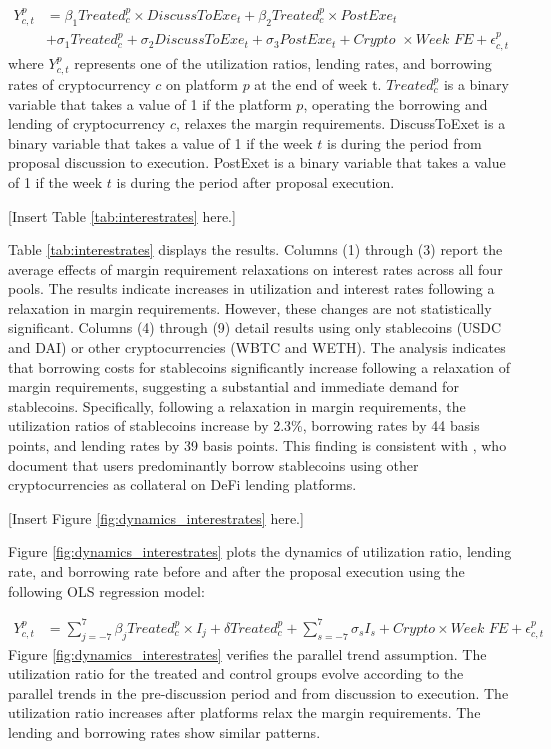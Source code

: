 \documentclass[12pt]{article}
\begin{document}
\begin{align}
     \nonumber Y_{c,t}^p&= \beta_1Treated_{c}^{p}\times DiscussToExe_t + \beta_2Treated^{p}_{c}\times PostExe_{t}\\\nonumber &+ \sigma_1Treated^p_{c} + \sigma_2 DiscussToExe_t+\sigma_3 PostExe_{t} + \textit{Crypto }\times\textit{Week FE}+\epsilon_{c,t}^p\label{eq:interestrates}
\end{align}
where $Y_{c,t}^p$ represents one of the utilization ratios, lending rates, and borrowing rates of cryptocurrency $c$ on platform $p$ at the end of week t. $Treated^{p}_{c}$ is a binary variable that takes a value of 1 if the platform $p$, operating the borrowing and lending of cryptocurrency $c$, relaxes the margin requirements. DiscussToExet is a binary variable that takes a value of 1 if the week $t$ is during the period from proposal discussion to execution. PostExet is a binary variable that takes a value of 1 if the week $t$ is during the period after proposal execution.

\centerline{[Insert Table \ref{tab:interestrates} here.]}

Table \ref{tab:interestrates} displays the results. Columns (1) through (3) report the average effects of margin requirement relaxations on interest rates across all four pools. The results indicate increases in utilization and interest rates following a relaxation in margin requirements. However, these changes are not statistically significant. Columns (4) through (9) detail results using only stablecoins (USDC and DAI) or other cryptocurrencies (WBTC and WETH). The analysis indicates that borrowing costs for stablecoins significantly increase following a relaxation of margin requirements, suggesting a substantial and immediate demand for stablecoins. Specifically, following a relaxation in margin requirements, the utilization ratios of stablecoins increase by 2.3\%, borrowing rates by 44 basis points, and lending rates by 39 basis points. This finding is consistent with \cite{tovanich2023contagion}, who document that users predominantly borrow stablecoins using other cryptocurrencies as collateral on DeFi lending platforms.

\centerline{[Insert Figure \ref{fig:dynamics_interestrates} here.]}

Figure \ref{fig:dynamics_interestrates} plots the dynamics of utilization ratio, lending rate, and borrowing rate before and after the proposal execution using the following OLS regression model:

\begin{align}
 Y_{c,t}^p&=\sum_{j=-7}^{7}\beta_jTreated_{c}^p\times I_j+\delta Treated_{c}^p+\sum_{s=-7}^{7}\sigma_sI_s+ \textit{Crypto}\times\textit{Week FE}+\epsilon_{c,t}^p
\end{align}
Figure \ref{fig:dynamics_interestrates} verifies the parallel trend assumption. The utilization ratio for the treated and control groups evolve according to the parallel trends in the pre-discussion period and from discussion to execution. The utilization ratio increases after platforms relax the margin requirements. The lending and borrowing rates show similar patterns.
\end{document}
